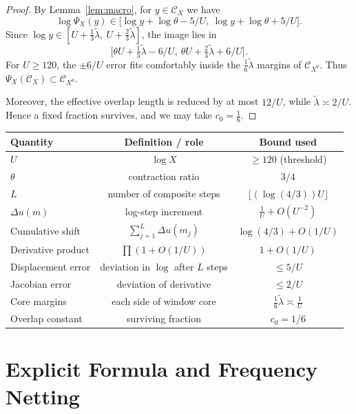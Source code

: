 \documentclass[11pt]{article}
\theoremstyle{plain}
\theoremstyle{definition}
\theoremstyle{remark}
\begin{document}
\begin{proof}
By Lemma~\ref{lem:macro}, for $y\in \mathcal C_X$ we have
\[
\log \Psi_X(y)\in \big[\log y+\log\theta-5/U,\ \log y+\log\theta+5/U\big].
\]
Since $\log y\in [U+\tfrac13\tilde\lambda,\ U+\tfrac23\tilde\lambda]$, the image lies in
\[
\Big[\theta U+\tfrac13\tilde\lambda-6/U,\ \theta U+\tfrac23\tilde\lambda+6/U\Big].
\]
For $U\ge120$, the $\pm 6/U$ error fits comfortably inside the $\tfrac16\tilde\lambda$ margins of $\mathcal C_{X^\theta}$. Thus $\Psi_X(\mathcal C_X)\subset\mathcal C_{X^\theta}$.

Moreover, the effective overlap length is reduced by at most $12/U$, while $\tilde\lambda\asymp 2/U$. Hence a fixed fraction survives, and we may take $c_0=\tfrac{1}{6}$.
\end{proof}

\begin{center}
\begin{tabular}{|l|c|c|}
\hline
Quantity & Definition / role & Bound used \\
\hline
$U$ & $\log X$ & $\ge 120$ (threshold) \\
$\theta$ & contraction ratio & $3/4$ \\
$L$ & number of composite steps & $\lfloor (\log(4/3))U \rfloor$ \\
$\Delta u(m)$ & log-step increment & $\tfrac{1}{U}+O(U^{-2})$ \\
Cumulative shift & $\sum_{j=1}^L \Delta u(m_j)$ & $\log(4/3)+O(1/U)$ \\
Derivative product & $\prod (1+O(1/U))$ & $1+O(1/U)$ \\
Displacement error & deviation in $\log$ after $L$ steps & $\le 5/U$ \\
Jacobian error & deviation of derivative & $\le 2/U$ \\
Core margins & each side of window core & $\tfrac{1}{6}\tilde\lambda \asymp \tfrac{1}{U}$ \\
Overlap constant & surviving fraction & $c_0 = 1/6$ \\
\hline
\end{tabular}
\end{center}

\section{Explicit Formula and Frequency Netting}\label{sec:explicit}
\end{document}
